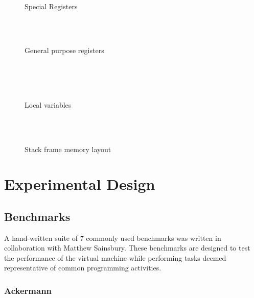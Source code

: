 \documentclass[english,a4paper]{report}
\begin{document}
\begin{figure}
	\centering
	\begin{bytefield}[bitwidth=0.3em]{64}
		 \\
		\begin{rightwordgroup}{Special Registers}
			  \\
			 \\
		\end{rightwordgroup} \\
		
		\begin{rightwordgroup}{General purpose registers}
			\\
			\\
			\\
		\end{rightwordgroup} \\
		
		\begin{rightwordgroup}{Local variables}
				\\
			 \\[1ex]
		\end{rightwordgroup} \\
	\end{bytefield}
	\caption{Stack frame memory layout}
	\label{fig:stframe}
\end{figure}


\chapter{Experimental Design}

\section{Benchmarks}

A hand-written suite of 7 commonly used benchmarks was written in collaboration with Matthew Sainsbury. These benchmarks are designed to test the performance of the virtual machine while performing tasks deemed representative of common programming activities.  

\subsection{Ackermann}
\end{document}
